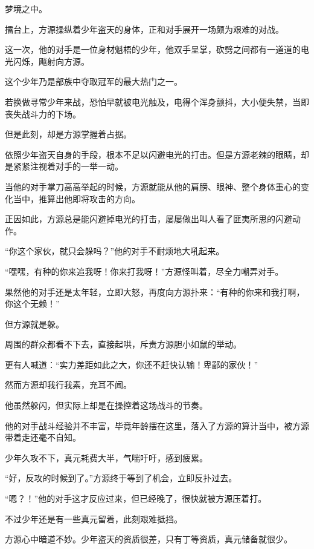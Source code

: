 
\begin{this_body}



梦境之中。

擂台上，方源操纵着少年盗天的身体，正和对手展开一场颇为艰难的对战。

这一次，他的对手是一位身材魁梧的少年，他双手呈掌，砍劈之间都有一道道的电光闪烁，飚射向方源。

这个少年乃是部族中夺取冠军的最大热门之一。

若换做寻常少年来战，恐怕早就被电光触及，电得个浑身颤抖，大小便失禁，当即丧失战斗力的下场。

但是此刻，却是方源掌握着占据。

依照少年盗天自身的手段，根本不足以闪避电光的打击。但是方源老辣的眼睛，却是紧紧注视着对手的一举一动。

当他的对手掌刀高高举起的时候，方源就能从他的肩膀、眼神、整个身体重心的变化当中，推算出他即将攻击的方向。

正因如此，方源总是能闪避掉电光的打击，屡屡做出叫人看了匪夷所思的闪避动作。

“你这个家伙，就只会躲吗？”他的对手不耐烦地大吼起来。

“嘿嘿，有种的你来追我呀！你来打我呀！”方源怪叫着，尽全力嘲弄对手。

果然他的对手还是太年轻，立即大怒，再度向方源扑来：“有种的你来和我打啊，你这个无赖！”

但方源就是躲。

周围的群众都看不下去，直接起哄，斥责方源胆小如鼠的举动。

更有人喊道：“实力差距如此之大，你还不赶快认输！卑鄙的家伙！”

然而方源却我行我素，充耳不闻。

他虽然躲闪，但实际上却是在操控着这场战斗的节奏。

他的对手战斗经验并不丰富，毕竟年龄摆在这里，落入了方源的算计当中，被方源带着走还毫不自知。

少年久攻不下，真元耗费大半，气喘吁吁，感到疲累。

“好，反攻的时候到了。”方源终于等到了机会，立即反扑过去。

“嗯？！”他的对手这才反应过来，但已经晚了，很快就被方源压着打。

不过少年还是有一些真元留着，此刻艰难抵挡。

方源心中暗道不妙。少年盗天的资质很差，只有丁等资质，真元储备就很少。


\end{this_body}

